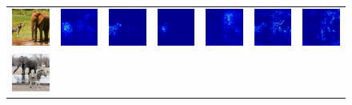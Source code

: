\begin{figure}
\begin{center}
\begin{tabular}{ccccccc}
\vspace{-2.5pt}
\includegraphics[width=0.14\linewidth,height=0.115\linewidth]{figs/examples/googlenet/soft/zeb-ele1} &
\includegraphics[width=0.14\linewidth,height=0.115\linewidth]{figs/examples/alexnet/soft/zeb-ele1_sali_341} &
\includegraphics[width=0.14\linewidth,height=0.115\linewidth]{figs/examples/vggnet/soft/zeb-ele1_sali_341} &
\includegraphics[width=0.14\linewidth,height=0.115\linewidth]{figs/examples/googlenet/soft/zeb-ele1_sali_341} &
\includegraphics[width=0.14\linewidth,height=0.115\linewidth]{figs/examples/alexnet/soft/zeb-ele1_sali_387} &
\includegraphics[width=0.14\linewidth,height=0.115\linewidth]{figs/examples/vggnet/soft/zeb-ele1_sali_387} &
\includegraphics[width=0.14\linewidth,height=0.115\linewidth]{figs/examples/googlenet/soft/zeb-ele1_sali_387} \\
\vspace{-2.5pt}
\includegraphics[width=0.14\linewidth,height=0.115\linewidth]{figs/examples/googlenet/soft/zeb-ele2} &

\end{tabular}
\end{center}
\end{figure}
